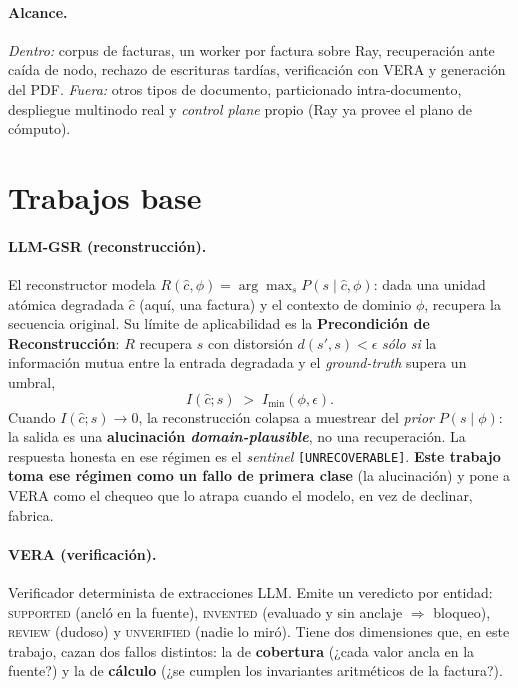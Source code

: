 \paragraph{Alcance.} \emph{Dentro:} corpus de facturas, un worker por factura sobre Ray,
recuperación ante caída de nodo, rechazo de escrituras tardías, verificación con VERA y
generación del PDF. \emph{Fuera:} otros tipos de documento, particionado intra-documento,
despliegue multinodo real y \emph{control plane} propio (Ray ya provee el plano de cómputo).

\section{Trabajos base}

\paragraph{LLM-GSR (reconstrucción).} El reconstructor modela
$R(\hat{c},\phi)=\arg\max_{s} P(s \mid \hat{c},\phi)$: dada una unidad atómica degradada
$\hat{c}$ (aquí, una factura) y el contexto de dominio $\phi$, recupera la secuencia
original. Su límite de aplicabilidad es la \textbf{Precondición de Reconstrucción}: $R$
recupera $s$ con distorsión $d(s',s)<\epsilon$ \emph{sólo si} la información mutua entre la
entrada degradada y el \emph{ground-truth} supera un umbral,
\[
  I(\hat{c};s) \;>\; I_{\min}(\phi,\epsilon).
\]
Cuando $I(\hat{c};s)\!\to\!0$, la reconstrucción colapsa a muestrear del \emph{prior}
$P(s\mid\phi)$: la salida es una \textbf{alucinación \emph{domain-plausible}}, no una
recuperación. La respuesta honesta en ese régimen es el \emph{sentinel}
\texttt{[UNRECOVERABLE]}. \textbf{Este trabajo toma ese régimen como un fallo de primera
clase} (la alucinación) y pone a VERA como el chequeo que lo atrapa cuando el modelo, en vez
de declinar, fabrica.

\paragraph{VERA (verificación).} Verificador determinista de extracciones LLM. Emite un
veredicto por entidad: \textsc{supported} (ancló en la fuente), \textsc{invented} (evaluado y
sin anclaje $\Rightarrow$ bloqueo), \textsc{review} (dudoso) y \textsc{unverified} (nadie lo
miró). Tiene dos dimensiones que, en este trabajo, cazan dos fallos distintos: la de
\textbf{cobertura} (¿cada valor ancla en la fuente?) y la de \textbf{cálculo} (¿se cumplen
los invariantes aritméticos de la factura?).

